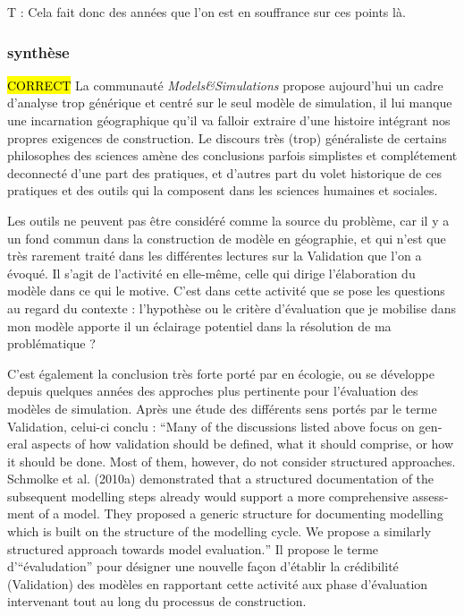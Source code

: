 T : Cela fait donc des années que l'on est en souffrance sur ces points là.

\subsubsection{synthèse}

\hl{CORRECT}
La communauté \textit{Models\&Simulations} propose aujourd'hui un cadre d'analyse trop générique et centré sur le seul modèle de simulation, il lui manque une incarnation géographique qu'il va falloir extraire d'une histoire intégrant nos propres exigences de construction. Le discours très (trop) généraliste de certains philosophes des sciences amène des conclusions parfois simplistes et complétement deconnecté d'une part des pratiques, et d'autres part du volet historique de ces pratiques et des outils qui la composent dans les sciences humaines et sociales. 

Les outils ne peuvent pas être considéré comme la source du problème, car il y a un fond commun dans la construction de modèle en géographie, et qui n'est que très rarement traité dans les différentes lectures sur la Validation que l'on a évoqué. Il s'agit de l'activité en elle-même, celle qui dirige l'élaboration du modèle dans ce qui le motive. C'est dans cette activité que se pose les questions au regard du contexte : l'hypothèse ou le critère d'évaluation que je mobilise dans mon modèle apporte il un éclairage potentiel dans la résolution de ma problématique ?


C'est également la conclusion très forte porté par \textcite[120]{Augusiak2014} en écologie, ou se développe depuis quelques années des approches plus pertinente pour l'évaluation des modèles de simulation. Après une étude des différents sens portés par le terme Validation, celui-ci conclu : \foreignquote{english}{Many of the discussions listed above focus on general aspects of how validation should be defined, what it should comprise, or how it should be done. Most of them, however, do not consider structured approaches. Schmolke et al. (2010a) demonstrated that a structured documentation of the subsequent modelling steps already would support a more comprehensive assessment of a model. They proposed a generic structure for documenting modelling which is built on the structure of the modelling cycle. We propose a similarly structured approach towards model evaluation.} Il propose le terme d'\enquote{évaludation} pour désigner une nouvelle façon d'établir la crédibilité (Validation) des modèles en rapportant cette activité aux phase d'évaluation intervenant tout au long du processus de construction. 

